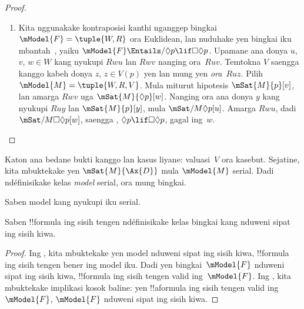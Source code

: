 \documentclass[../../../include/open-logic-section]{subfiles}
\begin{document}
\begin{proof}
\begin{enumerate}
    $V$, $\mSat{M}{p}[z]$ kanggo kabeh $z$ kang nyukupi $Ruz$,
    mula $\mSat{M}{\Box p}[u]$. Nanging miturut hipotesis ,
    $\Box p \lif \Box \Box p$, bener ing $u$, saengga
    $\mSat{M}{\Box \Box
      p}[u]$. Amarga $Ruv$ lan $Rvw$, kita duwe $\mSat{M}{p}[w]$;
    miturut definisi~$V$ iki mung bisa yen $Ruw$, kaya kang dikarepake.
  \item Kita nggunakake kontraposisi kanthi nganggep bingkai
    $\mModel{F} = \tuple{W, R}$ ora Euklidean, lan nuduhake yen
    bingkai iku mbantah~, yaiku $\mModel{F} \Entails/ \Diamond p \lif
      \Box\Diamond p$. Upamane ana donya $u$, $v$, $w \in W$
    kang nyukupi $Rwu$ lan $Rwv$ nanging ora~$Ruv$. Temtokna $V$
    saengga kanggo kabeh donya $z$, $z \in V(p)$ yen lan mung yen
    \emph{ora}~$Ruz$. Pilih $\mModel{M} =\tuple{W, R, V}$. Mula miturut
    hipotesis $\mSat{M}{p}[v]$, lan amarga $Rwv$ uga
    $\mSat{M}{\Diamond p}[w]$. Nanging ora ana donya $y$ kang
    nyukupi $Ruy$ lan $\mSat{M}{p}[y]$, mula $\mSat/{M}{\Diamond
      p}[u]$. Amarga $Rwu$, dadi $\mSat/{M}{\Box\Diamond
      p}[w]$, saengga , $\Diamond p \lif \Box\Diamond p$,
    gagal ing~$w$.
  \end{enumerate}
\end{proof}

Katon ana bedane bukti kanggo  lan
kasus liyane: valuasi~$V$ ora kasebut. Sejatine, kita mbuktekake yen
$\mSat{M}{\Ax{D}}$ mula $\mModel{M}$ serial. Dadi 
ndéfinisikake kelas \emph{model} serial, ora mung bingkai.

\begin{cor}
  Saben model kang nyukupi  iku serial.
\end{cor}

\begin{cor}
Saben !!{formula} ing sisih tengen 
ndéfinisikake kelas bingkai kang nduweni sipat ing sisih kiwa.
\end{cor}

\begin{proof}
  Ing , kita mbuktekake yen model
  nduweni sipat ing sisih kiwa, !!{formula} ing sisih tengen bener
  ing model iku. Dadi yen bingkai~$\mModel{F}$ nduweni sipat ing sisih
  kiwa, !!{formula} ing sisih tengen valid ing~$\mModel{F}$. Ing
  , kita mbuktekake implikasi kosok
  baline: yen !!a{formula} ing sisih tengen valid ing~$\mModel{F}$,
  $\mModel{F}$ nduweni sipat ing sisih kiwa.
\end{proof}
\end{document}

